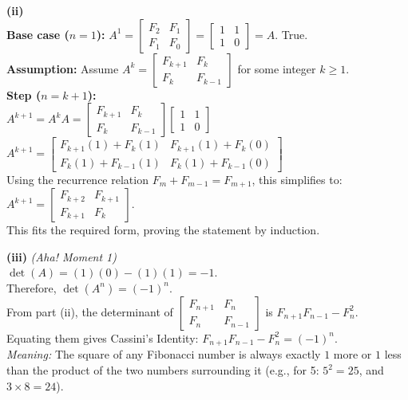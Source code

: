 \begin{solution}
\medskip
\textbf{(ii)} \\
\textbf{Base case ($n=1$):} $A^1 = \begin{bmatrix} F_2 & F_1 \\ F_1 & F_0 \end{bmatrix} = \begin{bmatrix} 1 & 1 \\ 1 & 0 \end{bmatrix} = A$. True. \\
\textbf{Assumption:} Assume $A^k = \begin{bmatrix} F_{k+1} & F_k \\ F_k & F_{k-1} \end{bmatrix}$ for some integer $k \ge 1$. \\
\textbf{Step ($n=k+1$):} \\
$A^{k+1} = A^k A = \begin{bmatrix} F_{k+1} & F_k \\ F_k & F_{k-1} \end{bmatrix} \begin{bmatrix} 1 & 1 \\ 1 & 0 \end{bmatrix}$ \\
$A^{k+1} = \begin{bmatrix} F_{k+1}(1) + F_k(1) & F_{k+1}(1) + F_k(0) \\ F_k(1) + F_{k-1}(1) & F_k(1) + F_{k-1}(0) \end{bmatrix}$ \\
Using the recurrence relation $F_m + F_{m-1} = F_{m+1}$, this simplifies to: \\
$A^{k+1} = \begin{bmatrix} F_{k+2} & F_{k+1} \\ F_{k+1} & F_k \end{bmatrix}$. \\
This fits the required form, proving the statement by induction.

\medskip
\textbf{(iii)} \textit{(Aha! Moment 1)} \\
$\det(A) = (1)(0) - (1)(1) = -1$. \\
Therefore, $\det(A^n) = (-1)^n$. \\
From part (ii), the determinant of $\begin{bmatrix} F_{n+1} & F_n \\ F_n & F_{n-1} \end{bmatrix}$ is $F_{n+1}F_{n-1} - F_n^2$. \\
Equating them gives Cassini's Identity: \textbf{$F_{n+1}F_{n-1} - F_n^2 = (-1)^n$}. \\
\textit{Meaning:} The square of any Fibonacci number is always exactly $1$ more or $1$ less than the product of the two numbers surrounding it (e.g., for 5: $5^2 = 25$, and $3 \times 8 = 24$).


\end{solution}

